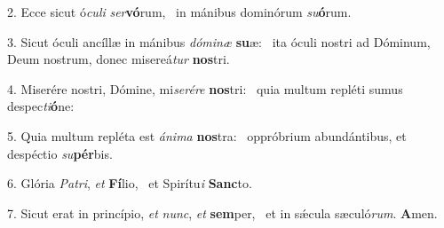 2. Ecce sicut ó\textit{cu}\textit{li} \textit{ser}\textbf{vó}rum, \ast\  in mánibus dominórum \textit{su}\textbf{ó}rum.\

3. Sicut óculi ancíllæ in mánibus \textit{dó}\textit{mi}\textit{næ} \textbf{su}æ: \ast\  ita óculi nostri ad Dóminum, Deum nostrum, donec misereá\textit{tur} \textbf{nos}tri.\

4. Miserére nostri, Dómine, mi\textit{se}\textit{ré}\textit{re} \textbf{nos}tri: \ast\  quia multum repléti sumus despec\textit{ti}\textbf{ó}ne:\

5. Quia multum repléta est \textit{á}\textit{ni}\textit{ma} \textbf{nos}tra: \ast\  oppróbrium abundántibus, et despéctio \textit{su}\textbf{pér}bis.\

6. Glória \textit{Pa}\textit{tri}, \textit{et} \textbf{Fí}lio, \ast\  et Spirítu\textit{i} \textbf{Sanc}to.\

7. Sicut erat in princípio, \textit{et} \textit{nunc}, \textit{et} \textbf{sem}per, \ast\  et in sǽcula sæculó\textit{rum}. \textbf{A}men.\

